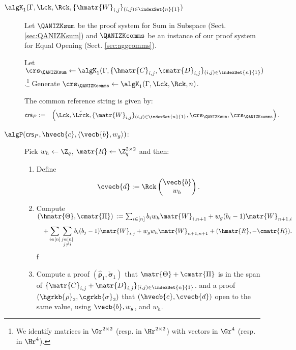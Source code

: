 \begin{description}


\item[$\algK_1(\Gamma, \Lck,\Rck,\{\hmatr{W}_{i,j}\}_{(i,j) \in \indexSet{n}{1}})$]

Let $\QANIZKsum$ be the proof system for Sum in Subspace 
(Sect. \ref{sec:QANIZKsum}) and $\QANIZKcomms$
be an instance of our proof system for Equal Opening (Sect. \ref{sec:aggcomms}).

Let
$\crs_\QANIZKsum \gets \algK_1(\Gamma, \{\hmatr{C}_{i,j},\cmatr{D}_{i,j}\}_{(i,j)\in\indexSet{n}{1}})$.\footnote{We identify
matrices in $\Gr^{2 \times 2}$ (resp. in $\Hr^{2 \times 2}$) with vectors in $\Gr^{4}$ (resp. in $\Hr^{4}$).} Generate $\crs_\QANIZKcomms \gets \algK_1(\Gamma, \Lck,\Rck,n)$. 

The common reference string is given by:
\begin{eqnarray*}
\mathsf{crs}_P&:=&\left(  \Lck,
    \check{\Lrck}, \{\matr{W}_{i,j} \}_{(i,j) \in \indexSet{n}{1}},\crs_\QANIZKsum,\crs_\QANIZKcomms \right).
 \end{eqnarray*}
\item[$\algP(\mathsf{crs}_P, \hvecb{c}, \langle \vecb{b}, w_g \rangle)$:]
Pick $w_h \gets \Z_q$,  $\matr{R} \gets \Z_q^{2\times 2}$ and then: 
\begin{enumerate}
\item Define 
$$\cvecb{d} := \Rck \begin{pmatrix} \vecb{b} \\ w_h \end{pmatrix}.$$ 
\item Compute 
 $(\hmatr{\Theta}, \cmatr{\Pi})\, := \sum_{i \in [n]}
 b_i w_h  \matr{W}_{i,n+1}+
 w_g(b_i-1) \matr{W}_{n+1,i}
 $
\begin{eqnarray} \label{eq:ThetaPi}
& &
    +
       \sum_{i \in [n]}  \sum_{\substack{j \in [n]\\ j\neq i}} b_i (b_j-1) \matr{W}_{i,j}  +
       w_gw_h \matr{W}_{n+1,n+1} +  (\hmatr{R},-\cmatr{R}).
 \end{eqnarray}ƒ

\item Compute a proof $(\hat{\boldsymbol \rho}_1,\check{\boldsymbol \sigma}_1)$
that $\matr{\Theta}+\cmatr{\Pi}$ is in the span of 
$\{\matr{C}_{i,j}+\matr{D}_{i,j}\}_{(i,j)\in\indexSet{n}{1}}$.
and a proof $(\hgrkb{\rho}_{2}, \cgrkb{\sigma}_{2})$
that
$(\hvecb{c},\cvecb{d})$ open to the same value,
using $\vecb{b},w_g$, and $w_h$. \\
\end{enumerate}


\end{description}
